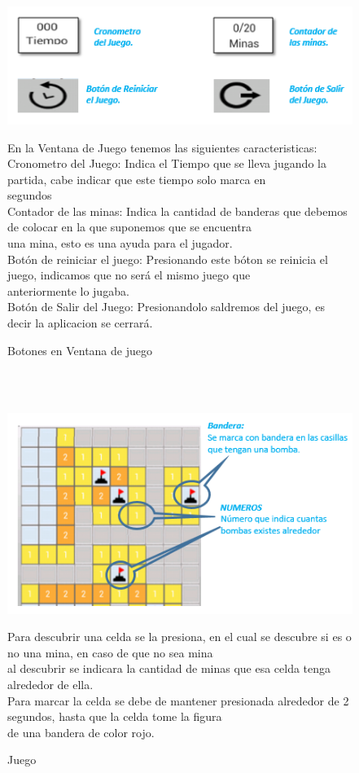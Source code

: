 \begin{figure}[htbp]
\begin{center}
\includegraphics[width=.70\textwidth]{./imagenes/botonesR.png}
\caption{Botones en Ventana de juego}
\label{Juego}
\end{center}
En la Ventana de Juego tenemos las siguientes caracteristicas:
\\Cronometro del Juego: Indica el Tiempo que se lleva jugando la partida, cabe indicar que este tiempo solo marca en \\segundos
\\Contador de las minas: Indica la cantidad de banderas que debemos de colocar en la que suponemos que se encuentra
\\una mina, esto es una ayuda para el jugador.
\\Botón de reiniciar el juego: Presionando este bóton se reinicia el juego, indicamos que no será el mismo juego que
\\anteriormente lo jugaba.
\\Botón de Salir del Juego: Presionandolo saldremos del juego, es decir la aplicacion se cerrará.
\end{figure} 
\ \\ \ \\
\begin{figure}[htbp]
\begin{center}
\includegraphics[width=.70\textwidth]{./imagenes/Tabla1.png}
\caption{Juego}
\label{Juego}
\end{center}
Para descubrir una celda se la presiona, en el cual se descubre si es o no una mina, en caso de que no sea mina
\\ al descubrir se indicara la cantidad de minas que esa celda tenga alrededor de ella.
\\Para marcar la celda se debe de mantener presionada alrededor de 2 segundos, hasta que la celda tome la figura
\\de una bandera de color rojo.
\end{figure} 
